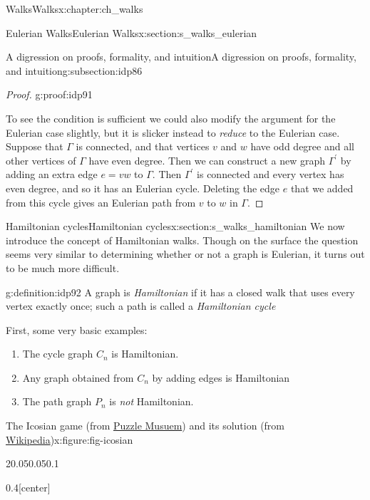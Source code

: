 \documentclass[oneside,10pt,]{book}
\numberwithin{equation}{section}
\begin{document}
\begin{chapterptx}{Walks}{}{Walks}{}{}{x:chapter:ch_walks}
\begin{sectionptx}{Eulerian Walks}{}{Eulerian Walks}{}{}{x:section:s_walks_eulerian}
\begin{subsectionptx}{A digression on proofs, formality, and intuition}{}{A digression on proofs, formality, and intuition}{}{}{g:subsection:idp86}
\begin{proof}{}{g:proof:idp91}
\par
To see the condition is sufficient we could also modify the argument for the Eulerian case slightly, but it is slicker instead to \emph{reduce} to the Eulerian case.  Suppose that \(\Gamma\) is connected, and that vertices \(v\) and \(w\) have odd degree and all other vertices of \(\Gamma\) have even degree.  Then we can construct a new graph \(\Gamma^\prime\) by adding an extra edge \(e=vw\) to \(\Gamma\).  Then \(\Gamma^\prime\) is connected and every vertex has even degree, and so it has an Eulerian cycle.  Deleting the edge \(e\) that we added from this cycle gives an Eulerian path from \(v\) to \(w\) in \(\Gamma\).%
\end{proof}
\end{subsectionptx}
\end{sectionptx}
%
%
\typeout{************************************************}
\typeout{************************************************}
%
\begin{sectionptx}{Hamiltonian cycles}{}{Hamiltonian cycles}{}{}{x:section:s_walks_hamiltonian}
We now introduce the concept of Hamiltonian walks. Though on the surface the question seems very similar to determining whether or not a graph is Eulerian, it turns out to be much more difficult.%
\begin{definition}{}{g:definition:idp92}%
A graph is \emph{Hamiltonian} if it has a closed walk that uses every vertex exactly once; such a path is called a \emph{Hamiltonian cycle}%
\end{definition}
First, some very basic examples:%
%
\begin{enumerate}
\item{}The cycle graph \(C_n\) is Hamiltonian.%
\item{}Any graph obtained from \(C_n\) by adding edges is Hamiltonian%
\item{}The path graph \(P_n\) is \emph{not} Hamiltonian.%
\end{enumerate}
\begin{figureptx}{The Icosian game (from \href{https://www.puzzlemuseum.com/month/picm02/200207icosian.htm}{Puzzle Musuem}) and its solution (from \href{https://en.wikipedia.org/wiki/Icosian_game}{Wikipedia})}{x:figure:fig-icosian}{}%
\begin{sidebyside}{2}{0.05}{0.05}{0.1}%
\begin{sbspanel}{0.4}[center]%

\end{sbspanel}
\end{sidebyside}
\end{figureptx}
\end{sectionptx}
\end{chapterptx}
\end{document}
